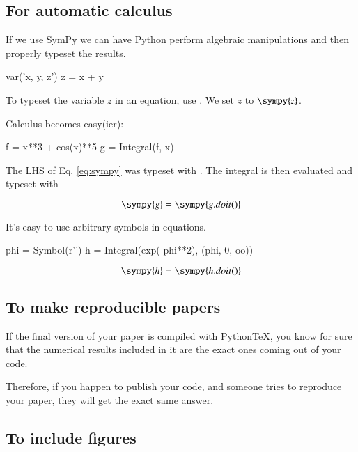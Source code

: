 \documentclass{aa}
\newcommand{\pytex}{Python\TeX}
\begin{document}
  \subsection{For automatic calculus}

    If we use SymPy we can have Python perform algebraic manipulations and then properly typeset the results.

\begin{sympyblock}
var('x, y, z')
z = x + y
\end{sympyblock}

To typeset the variable $z$ in an equation, use . 
We set $z$ to $\sympy{z}$.

Calculus becomes easy(ier):

\begin{sympyblock}
f = x**3 + cos(x)**5
g = Integral(f, x)
\end{sympyblock}

The LHS of Eq. \ref{eq:sympy} was typeset with . The integral is then evaluated and typeset with 

\begin{equation} \label{eq:sympy}
  \sympy{g}=\sympy{g.doit()}  
\end{equation}


It's easy to use arbitrary symbols in equations.

\begin{sympyblock}
phi = Symbol(r'\phi')
h = Integral(exp(-phi**2), (phi, 0, oo))
\end{sympyblock}

\begin{equation} 
  \sympy{h}=\sympy{h.doit()}
\end{equation}

  \subsection{To make reproducible papers}

    If the final version of your paper is compiled with \pytex, you know for sure that the numerical results included in it are the exact ones coming out of your code.

    Therefore, if you happen to publish your code, and someone tries to reproduce your paper, they will get the exact same answer.


  \subsection{To include figures}
\end{document}
